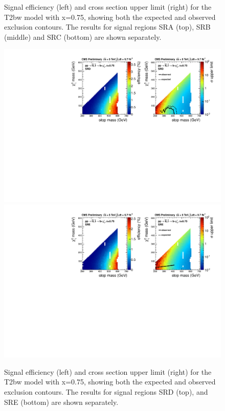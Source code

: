 \begin{figure}[hbt]
\begin{center}
    \caption{Signal efficiency (left) and cross section upper limit
      (right) for the T2bw model with x=0.75, showing both the expected and
      observed exclusion contours. The results for signal regions SRA (top),
      SRB (middle) and SRC (bottom) are shown separately.}
\label{fig:allsrlimitsT2bw0p75}
      \end{center}
\end{figure}

\begin{figure}[hbt]
  \begin{center}
        \includegraphics[width=1.\linewidth]{plots/T2bw_x75_SRD.pdf}
        \includegraphics[width=1.\linewidth]{plots/T2bw_x75_SRE.pdf}
    \caption{Signal efficiency (left) and cross section upper limit
      (right) for the T2bw model with x=0.75, showing both the expected and
      observed exclusion contours. The results for signal regions SRD (top),
      and SRE (bottom) are shown separately.}
\label{fig:allsrlimits2T2bw0p75}
      \end{center}
\end{figure}

